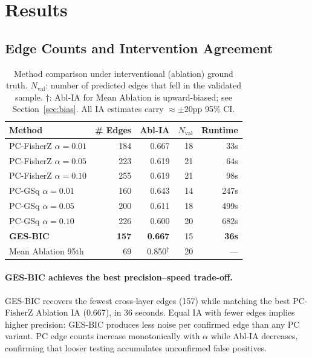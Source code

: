 \documentclass{article}
\begin{document}
\section{Results}

\subsection{Edge Counts and Intervention Agreement}

\begin{table}[t]
\centering
\caption{Method comparison under interventional (ablation) ground truth.
  $N_{\text{val}}$: number of predicted edges that fell in the validated
  sample. $\dagger$: Abl-IA for Mean Ablation is upward-biased; see
  Section~\ref{sec:bias}. All IA estimates carry $\approx\pm 20$pp 95\% CI.}
\label{tab:results}
\small
\setlength{\tabcolsep}{5pt}
\begin{tabular}{lrrrr}
\toprule
Method & \# Edges & Abl-IA & $N_{\text{val}}$ & Runtime \\
\midrule
PC-FisherZ $\alpha{=}0.01$ & 184 & 0.667 & 18 & 33s \\
PC-FisherZ $\alpha{=}0.05$ & 223 & 0.619 & 21 & 64s \\
PC-FisherZ $\alpha{=}0.10$ & 255 & 0.619 & 21 & 98s \\
PC-GSq $\alpha{=}0.01$     & 160 & 0.643 & 14 & 247s \\
PC-GSq $\alpha{=}0.05$     & 200 & 0.611 & 18 & 499s \\
PC-GSq $\alpha{=}0.10$     & 226 & 0.600 & 20 & 682s \\
\textbf{GES-BIC}           & \textbf{157} & \textbf{0.667} & 15 & \textbf{36s} \\
Mean Ablation 95th         & 69  & 0.850$^\dagger$ & 20 & --- \\
\bottomrule
\end{tabular}
\end{table}

\paragraph{GES-BIC achieves the best precision--speed trade-off.}
GES-BIC recovers the fewest cross-layer edges (157) while matching the best
PC-FisherZ Ablation IA (0.667), in 36 seconds. Equal IA with fewer edges
implies higher precision: GES-BIC produces less noise per confirmed edge than
any PC variant. PC edge counts increase monotonically with $\alpha$ while Abl-IA
decreases, confirming that looser testing accumulates unconfirmed false positives.
\end{document}
